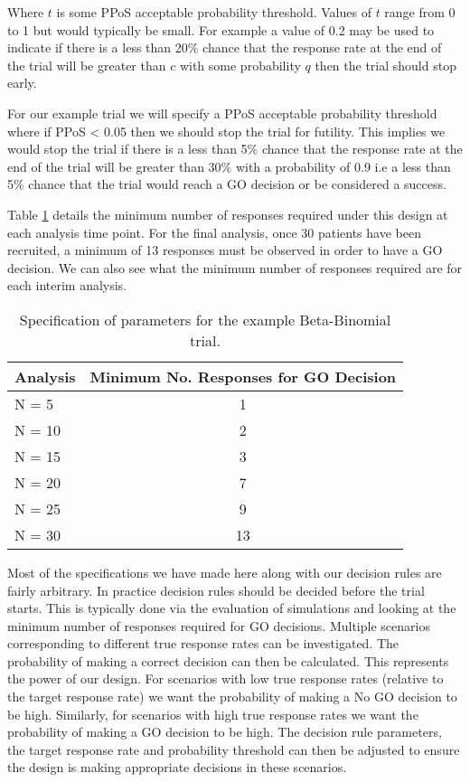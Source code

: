 Where $t$ is some PPoS acceptable probability threshold. Values of $t$ range from 0 to 1 but would typically be small. For example a value of 0.2 may be used to indicate if there is a less than 20\% chance that the response rate at the end of the trial will be greater than $c$ with some probability $q$ then the trial should stop early. 

For our example trial we will specify a PPoS acceptable probability threshold where if PPoS < 0.05 then we should stop the trial for futility. This implies we would stop the trial if there is a less than 5\% chance that the response rate at the end of the trial will be greater than 30\% with a probability of 0.9 i.e a less than 5\% chance that the trial would reach a GO decision or be considered a success. 

Table \ref{tab_etp:exampleBBspecs} details the minimum number of responses required under this design at each analysis time point. For the final analysis, once 30 patients have been recruited, a minimum of 13 responses must be observed in order to have a GO decision. We can also see what the minimum number of responses required are for each interim analysis.

\begin{table}[h!]
	\centering
	\caption{Specification of parameters for the example Beta-Binomial trial.}
	\label{tab_etp:exampleBBspecs}
	\begin{tabular}{l|c}
		\hline
		\textbf{Analysis}     & \textbf{Minimum No. Responses for GO Decision}               \\ \hline
		N = 5  & 1                            \\
		N = 10 & 2                            \\
		N = 15 & 3                           \\
		N = 20 & 7                            \\
		N = 25 & 9                         \\
		N = 30 & 13                  \\ \hline
	\end{tabular}
\end{table}

Most of the specifications we have made here along with our decision rules are fairly arbitrary. In practice decision rules should be decided before the trial starts. This is typically done via the evaluation of simulations and looking at the minimum number of responses required for GO decisions. Multiple scenarios corresponding to different true response rates can be investigated. The probability of making a correct decision can then be calculated. This represents the power of our design. For scenarios with low true response rates (relative to the target response rate) we want the probability of making a No GO decision to be high. Similarly, for scenarios with high true response rates we want the probability of making a GO decision to be high. The decision rule parameters, the target response rate and probability threshold can then be adjusted to ensure the design is making appropriate decisions in these scenarios. 	

